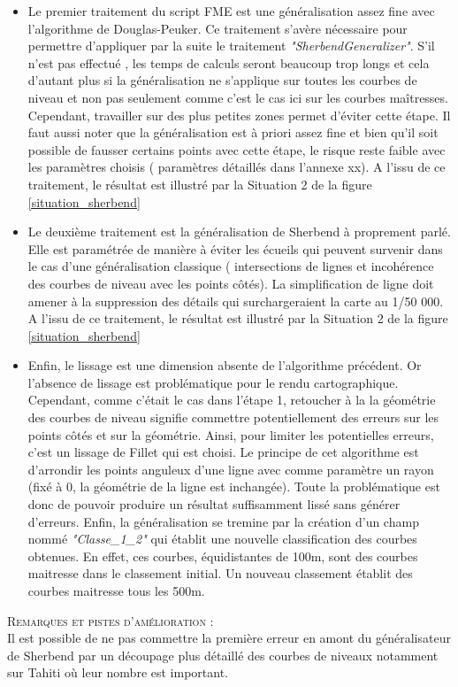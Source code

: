 \begin{itemize}
\item Le premier traitement du script FME est une généralisation assez fine avec l'algorithme de Douglas-Peuker.  Ce traitement s'avère nécessaire pour permettre d'appliquer par la suite le traitement \textit{"SherbendGeneralizer"}. S'il n'est pas effectué , les temps de calculs seront beaucoup trop longs et cela d'autant plus si la généralisation ne s'applique sur toutes les courbes de niveau et non pas seulement comme c'est le cas ici sur les courbes maîtresses. Cependant, travailler sur des plus petites zones permet d'éviter cette étape. Il faut aussi noter que la généralisation est à priori assez fine et bien qu'il soit possible de fausser certains points avec cette étape, le risque reste faible avec les paramètres choisis ( paramètres détaillés dans l'annexe xx). A l'issu de ce traitement, le résultat est illustré par la Situation 2 de la figure \ref{situation_sherbend}
\item Le deuxième traitement est la généralisation de Sherbend à proprement parlé. Elle est paramétrée de manière à éviter les écueils qui peuvent survenir dans le cas d'une généralisation classique ( intersections de lignes et incohérence des courbes de niveau avec les points côtés). La simplification de ligne doit amener à la suppression des détails qui surchargeraient la carte au 1/50 000. A l'issu de ce traitement, le résultat est illustré par la Situation 2 de la figure \ref{situation_sherbend}
\item Enfin, le lissage est une dimension absente de l'algorithme précédent. Or l'absence de lissage est problématique pour le rendu cartographique. Cependant, comme c'était le cas dans l'étape 1, retoucher à la la géométrie des courbes de niveau signifie commettre potentiellement des erreurs sur les points côtés et sur la géométrie. Ainsi, pour limiter les potentielles erreurs, c'est un lissage de Fillet qui est choisi. Le principe de cet algorithme est d'arrondir les points anguleux d'une ligne avec comme paramètre un rayon (fixé à 0, la géométrie de la ligne est inchangée). Toute la problématique est donc de pouvoir produire un résultat suffisamment lissé sans générer d'erreurs. Enfin, la généralisation se tremine par la création d'un champ nommé \textit{"Classe\_1\_2" }qui établit une nouvelle classification des courbes obtenues. En effet, ces courbes, équidistantes de 100m, sont des courbes maitresse dans le classement initial. Un  nouveau classement établit des courbes maitresse tous les 500m.\\
\end{itemize}
\textsc{Remarques et pistes d'amélioration :}\\
Il est possible de ne pas commettre la première erreur en amont du généralisateur de Sherbend par un découpage plus détaillé des courbes de niveaux notamment sur Tahiti où leur nombre est important.

